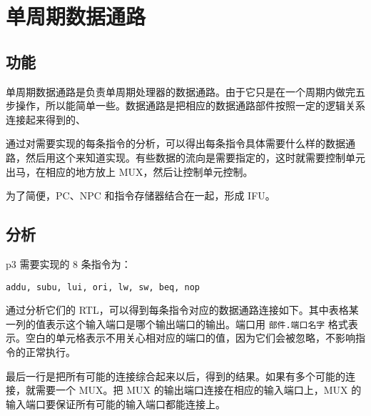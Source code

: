 \documentclass[12pt,AutoFakeBold]{article}
\begin{document}
\hypertarget{ux5355ux5468ux671fux6570ux636eux901aux8def}{%
\section{单周期数据通路}\label{ux5355ux5468ux671fux6570ux636eux901aux8def}}

\hypertarget{ux529fux80fd-11}{%
\subsection{功能}\label{ux529fux80fd-11}}

单周期数据通路是负责单周期处理器的数据通路。由于它只是在一个周期内做完五步操作，所以能简单一些。数据通路是把相应的数据通路部件按照一定的逻辑关系连接起来得到的、

通过对需要实现的每条指令的分析，可以得出每条指令具体需要什么样的数据通路，然后用这个来知道实现。有些数据的流向是需要指定的，这时就需要控制单元出马，在相应的地方放上 MUX，然后让控制单元控制。

为了简便，PC、NPC 和指令存储器结合在一起，形成 IFU。

\hypertarget{ux5206ux6790}{%
\subsection{分析}\label{ux5206ux6790}}

p3 需要实现的 8 条指令为：

\texttt{addu,\ subu,\ lui,\ ori,\ lw,\ sw,\ beq,\ nop}

通过分析它们的 RTL，可以得到每条指令对应的数据通路连接如下。其中表格某一列的值表示这个输入端口是哪个输出端口的输出。端口用 \texttt{部件.端口名字} 
格式表示。空白的单元格表示不用关心相对应的端口的值，因为它们会被忽略，不影响指令的正常执行。

最后一行是把所有可能的连接综合起来以后，得到的结果。如果有多个可能的连接，就需要一个 MUX。把 MUX 的输出端口连接在相应的输入端口上，MUX 的输入端口要保证所有可能的输入端口都能连接上。
\end{document}
